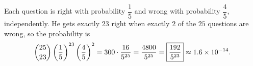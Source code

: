 Each question is right with probability $\dfrac15$ and wrong with probability $\dfrac45$, independently. He gets exactly $23$ right when exactly $2$ of the $25$ questions are wrong, so the probability is
\[\dbinom{25}{23}\left(\dfrac15\right)^{23}\left(\dfrac45\right)^{2}=300\cdot\dfrac{16}{5^{25}}=\dfrac{4800}{5^{25}}=\boxed{\dfrac{192}{5^{23}}}\approx1.6\times10^{-14}.\]
